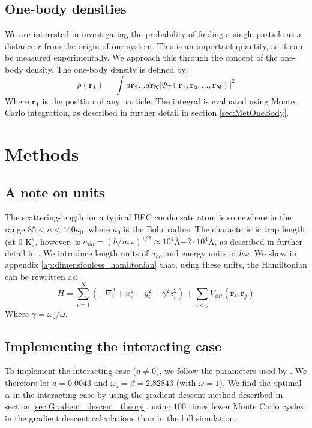 \documentclass[a4paper, 10pt]{article}
\begin{document}
	\subsection{One-body densities}
	We are interested in investigating the probability of finding a single particle at a distance $r$ from the origin of our system. This is an important quantity, as it can be measured experimentally. We approach this through the concept of the one-body density. The one-body density is defined by:
	\begin{equation}\label{eq:OneBodyDensity}
	\rho(\boldsymbol{r_1})=\int d\boldsymbol{r_2}...d\boldsymbol{r_N}|\Psi_T(\boldsymbol{r_1},\boldsymbol{r_2},...,\boldsymbol{r_N})|^2
	\end{equation}
	Where $\boldsymbol{r_1}$ is the position of any particle. The integral is evaluated using Monte Carlo integration, as described in further detail in section \ref{sec:MetOneBody}.
	
	\section{Methods}\label{Method_section}
	\subsection{A note on units}\label{sec:UNITS}
	The scattering-length for a typical BEC condensate atom is somewhere in the range $85<a<140a_0$, where $a_0$ is the Bohr radius. The characteristic trap length (at 0 K), however, is $a_{ho}=(\hbar/m\omega)^{1/2}\approx 10^{4}$Å$-2\cdot 10^{4}$Å, as described in further detail in \cite{DuBois2001}. We introduce length units of $a_{ho}$ and energy units of $\hbar \omega$. We show in appendix \ref{ap:dimensionless_hamiltonian} that, using these units, the Hamiltonian can be rewritten as:
	\begin{equation}\label{eq:Hamiltonian_dimensionless}
	H=\sum_{i=1}^N\left(-\nabla_i^2 + x_i^2+y_i^2+\gamma^2 z_i^2\right)+\sum_{i<j}V_{int}(\boldsymbol{r}_i, \boldsymbol{r}_j)
	\end{equation}
	Where $\gamma=\omega_z/\omega$.
	\subsection{Implementing the interacting case}
	To implement the interacting case ($a\neq 0$), we follow the parameters used by \cite{Nilsen2005}. We therefore let $a=0.0043$ and $\omega_z=\beta=2.82843$ (with $\omega=1$). We find the optimal $\alpha$ in the interacting case by using the gradient descent method described in section \ref{sec:Gradient_descent_theory}, using $100$ times fewer Monte Carlo cycles in the gradient descent calculations than in the full simulation.
\end{document}
